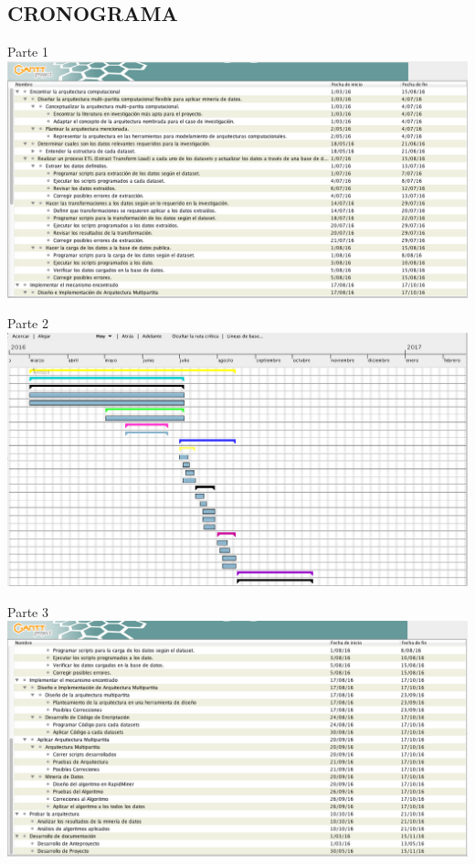 \documentclass[a4paper, 11pt, oneside]{article}
\theoremstyle{definition}
\theoremstyle{remark}
\begin{document}
\begin{table}
\begin{center}
\section{CRONOGRAMA}
\end{center}
\begin{center}
Parte 1
\includegraphics[width=\textwidth]{Imagen1.png}
\end{center}
\end{table}
\clearpage

\begin{table}
\begin{center}
Parte 2
\includegraphics[width=\textwidth]{Imagen3.png}
\end{center}
\end{table}
\clearpage

\begin{table}
\begin{center}
Parte 3
\includegraphics[width=\textwidth]{Imagen2.png}
\end{center}
\end{table}
\clearpage
\end{document}
